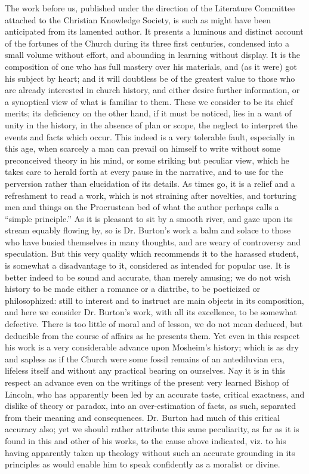 The work
before us, published under the direction of the Literature Committee
attached to the Christian Knowledge Society, is such as might have been
anticipated from its lamented author. It presents a luminous and
distinct account of the fortunes of the Church during its three first
centuries, condensed into a small volume without effort, and abounding
in learning without display. It is the composition of one who has full
mastery over his materials, and (as it were) got his subject by heart;
and it will doubtless be of the greatest value to those who are already
interested in church history, and either desire further information, or
a synoptical view of what is familiar to them. These we consider to be
its chief merits; its deficiency on the other hand, if it must be
noticed, lies in a want of unity in the history, in the absence of plan
or scope, the neglect to interpret the events and facts which occur.
This indeed is a very tolerable fault, especially in this age, when
scarcely a man can prevail on himself to write without some preconceived
theory in his mind, or some striking but peculiar view, which he takes
care to herald forth at every pause in the narrative, and to use for the
perversion rather than elucidation of its details. As times go, it is a
relief and a refreshment to read a work, which is not straining after
novelties, and torturing men and things on the Procrustean bed of what
the author perhaps calls a ``simple principle.'' As it is pleasant to
sit by a smooth river, and gaze upon its stream equably flowing by, so
is Dr. Burton's work a balm and solace to those who have busied
themselves in many thoughts, and are weary of controversy and
speculation. But this very quality which recommends it to the harassed
student, is somewhat a disadvantage to it, considered as intended for
popular use. It is better indeed to be sound and accurate, than
merely amusing; we do not wish history to be made either a romance or a
diatribe, to be poeticized or philosophized: still to interest and to
instruct are main objects in its composition, and here we consider Dr.
Burton's work, with all its excellence, to be somewhat defective.
There is too little of moral and of lesson, we do not mean deduced, but
deducible from the course of affairs as he presents them. Yet even in
this respect his work is a very considerable advance upon Mosheim's
history; which is as dry and sapless as if the Church were some fossil
remains of an antediluvian era, lifeless itself and without any
practical bearing on ourselves. Nay it is in this respect an advance
even on the writings of the present very learned Bishop of Lincoln, who
has apparently been led by an accurate taste, critical exactness, and
dislike of theory or paradox, into an over-estimation of facts, as such,
separated from their meaning and consequences. Dr. Burton had much of
this critical accuracy also; yet we should rather attribute this same
peculiarity, as far as it is found in this and other of his works, to
the cause above indicated, viz. to his having apparently taken up
theology without such an accurate grounding in its principles as would
enable him to speak confidently as a moralist or divine.

